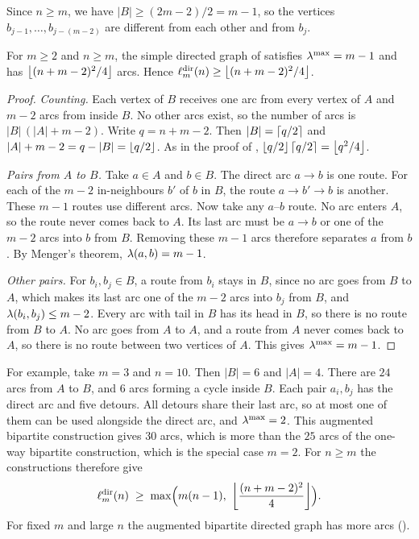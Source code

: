 Since $n \ge m$, we have $|B| \ge (2m-2)/2 = m-1$, so the vertices $b_{j-1}, \dots, b_{j-(m-2)}$ are different from each other and from $b_j$.

\begin{lemma}\label{lem:augmented-feasible}
For $m \ge 2$ and $n \ge m$, the simple directed graph of  satisfies $\lambda^{\max} = m-1$ and has $\left\lfloor (n+m-2)^2/4 \right\rfloor$ arcs. Hence $\ell_m^{\mathrm{dir}}(n) \ge \left\lfloor (n+m-2)^2/4 \right\rfloor$.
\end{lemma}

\begin{proof}
\emph{Counting.}
Each vertex of $B$ receives one arc from every vertex of $A$ and $m-2$ arcs from inside $B$.
No other arcs exist, so the number of arcs is $|B|\,(|A| + m - 2)$.
Write $q = n+m-2$. Then $|B| = \left\lceil q/2 \right\rceil$ and $|A| + m - 2 = q - |B| = \left\lfloor q/2 \right\rfloor$.
As in the proof of , $\left\lfloor q/2 \right\rfloor\left\lceil q/2 \right\rceil=\left\lfloor q^2/4 \right\rfloor$.

\emph{Pairs from $A$ to $B$.}
Take $a \in A$ and $b \in B$.
The direct arc $a \to b$ is one route.
For each of the $m-2$ in-neighbours $b'$ of $b$ in $B$, the route $a \to b' \to b$ is another.
These $m-1$ routes use different arcs.
Now take any $a$--$b$ route. No arc enters $A$, so the route never comes back to $A$.
Its last arc must be $a \to b$ or one of the $m-2$ arcs into $b$ from $B$.
Removing these $m-1$ arcs therefore separates $a$ from $b$.
By Menger's theorem, $\lambda(a,b) = m-1$.

\emph{Other pairs.}
For $b_i, b_j \in B$, a route from $b_i$ stays in $B$, since no arc goes from $B$ to $A$, which makes its last arc one of the $m-2$ arcs into $b_j$ from $B$, and $\lambda(b_i,b_j)\le m-2$.
Every arc with tail in $B$ has its head in $B$, so there is no route from $B$ to $A$.
No arc goes from $A$ to $A$, and a route from $A$ never comes back to $A$, so there is no route between two vertices of $A$.
This gives $\lambda^{\max} = m - 1$.
\end{proof}

For example, take $m = 3$ and $n = 10$.
Then $|B| = 6$ and $|A| = 4$.
There are $24$ arcs from $A$ to $B$, and $6$ arcs forming a cycle inside $B$.
Each pair $a_i, b_j$ has the direct arc and five detours. All detours share their last arc, so at most one of them can be used alongside the direct arc, and $\lambda^{\max} = 2$.
This augmented bipartite construction gives $30$ arcs, which is more than the $25$ arcs of the one-way bipartite construction, which is the special case $m=2$.
For $n\ge m$ the constructions therefore give
\[
    \ell_m^{\mathrm{dir}}(n)\;\ge\;\max\Bigl(m(n-1),\ \floorfrac{(n+m-2)^2}{4}\Bigr).
\]
For fixed $m$ and large $n$ the augmented bipartite directed graph has more arcs ().

